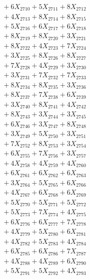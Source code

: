 \documentclass[a4paper,10pt]{article}
\begin{document}
{\begin{align}
&\;  + 6 X_{2710} + 5 X_{2711} + 8 X_{2712} \\[0.3ex]
&\;  + 4 X_{2713} + 8 X_{2714} + 8 X_{2715} \\[0.3ex]
&\;  + 5 X_{2716} + 6 X_{2717} + 6 X_{2718} \\[0.3ex]
&\;  + 8 X_{2719} + 8 X_{2720} + 3 X_{2721} \\[0.3ex]
&\;  + 8 X_{2722} + 4 X_{2723} + 7 X_{2724} \\[0.3ex]
&\;  + 3 X_{2725} + 8 X_{2726} + 8 X_{2727} \\[0.3ex]
&\;  + 7 X_{2728} + 4 X_{2729} + 3 X_{2730} \\[0.3ex]
&\;  + 3 X_{2731} + 7 X_{2732} + 7 X_{2733} \\[0.3ex]
&\;  + 8 X_{2734} + 8 X_{2735} + 3 X_{2736} \\[0.3ex]
&\;  + 8 X_{2737} + 7 X_{2738} + 6 X_{2739} \\[0.5ex]\allowbreak
&\;  + 3 X_{2740} + 8 X_{2741} + 4 X_{2742} \\[0.3ex]
&\;  + 8 X_{2743} + 3 X_{2744} + 3 X_{2745} \\[0.3ex]
&\;  + 6 X_{2746} + 3 X_{2747} + 8 X_{2748} \\[0.3ex]
&\;  + 3 X_{2749} + 5 X_{2750} + 3 X_{2751} \\[0.3ex]
&\;  + 7 X_{2752} + 8 X_{2753} + 3 X_{2754} \\[0.3ex]
&\;  + 6 X_{2755} + 7 X_{2756} + 3 X_{2757} \\[0.3ex]
&\;  + 4 X_{2758} + 4 X_{2759} + 4 X_{2760} \\[0.3ex]
&\;  + 6 X_{2761} + 6 X_{2762} + 6 X_{2763} \\[0.3ex]
&\;  + 3 X_{2764} + 5 X_{2765} + 6 X_{2766} \\[0.3ex]
&\;  + 4 X_{2767} + 6 X_{2768} + 6 X_{2769} \\[0.5ex]\allowbreak
&\;  + 5 X_{2770} + 5 X_{2771} + 5 X_{2772} \\[0.3ex]
&\;  + 5 X_{2773} + 7 X_{2774} + 4 X_{2775} \\[0.3ex]
&\;  + 6 X_{2776} + 6 X_{2777} + 7 X_{2778} \\[0.3ex]
&\;  + 4 X_{2779} + 5 X_{2780} + 6 X_{2781} \\[0.3ex]
&\;  + 4 X_{2782} + 5 X_{2783} + 4 X_{2784} \\[0.3ex]
&\;  + 6 X_{2785} + 6 X_{2786} + 7 X_{2787} \\[0.3ex]
&\;  + 4 X_{2788} + 4 X_{2789} + 6 X_{2790} \\[0.3ex]
&\;  + 5 X_{2791} + 5 X_{2792} + 4 X_{2793} \\[0.3ex]

\end{align}}
\end{document}
